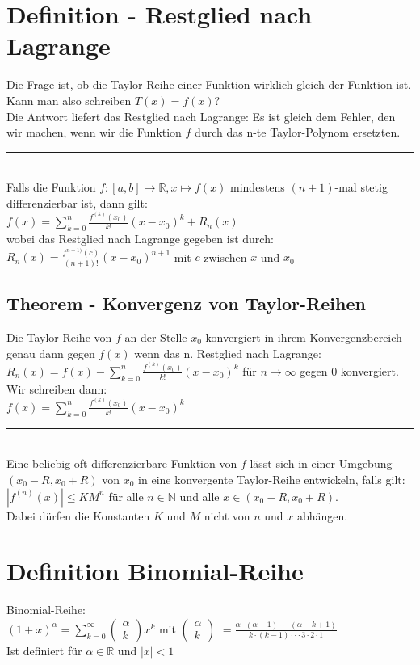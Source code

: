\documentclass[../main.tex]{subfiles}
\begin{document}
\section{Definition - Restglied nach Lagrange}
Die Frage ist, ob die Taylor-Reihe einer Funktion wirklich gleich der Funktion ist. 
Kann man also schreiben $T(x)=f(x)$? \\
Die Antwort liefert das Restglied nach Lagrange: Es ist gleich dem Fehler, den wir machen,
wenn wir die Funktion $f$ durch das n-te Taylor-Polynom ersetzten. \\
\noindent\rule{8cm}{0.4pt} \\
Falls die Funktion $f:[a,b]\to\mathbb{R},x\mapsto f(x)$ mindestens $(n+1)$-mal stetig
differenzierbar ist, dann gilt: \\ [7pt]
$f(x)=\sum\limits_{k=0}^n\frac{f^{(k)}(x_0)}{k!}(x-x_0)^k+R_n(x)$ \\ [7pt]
wobei das Restglied nach Lagrange gegeben ist durch: \\ [7pt]
$R_n(x)=\frac{f^{n+1)}(c)}{(n+1)!}(x-x_0)^{n+1}$ mit $c$ zwischen $x$ und $x_0$


\subsection{Theorem - Konvergenz von Taylor-Reihen}
Die Taylor-Reihe von $f$ an der Stelle $x_0$ konvergiert in ihrem Konvergenzbereich genau
dann gegen $f(x)$ wenn das n. Restglied nach Lagrange: \\ [7pt]
$R_n(x)=f(x)-\sum\limits_{k=0}^n\frac{f^{(k)}(x_0)}{k!}(x-x_0)^k$ für $n\to\infty$ gegen $0$ konvergiert.\\[7pt]
Wir schreiben dann: \\[7pt]
$f(x)=\sum\limits_{k=0}^n\frac{f^{(k)}(x_0)}{k!}(x-x_0)^k$
\noindent\rule{8cm}{0.4pt} \\
Eine beliebig oft differenzierbare Funktion von $f$ lässt sich in einer Umgebung $(x_0-R,x_0+R)$
von $x_0$ in eine konvergente Taylor-Reihe entwickeln, falls gilt: \\ [7pt]
$|f^{(n)}(x)|\leq KM^n$ für alle $n\in\mathbb{N}$ und alle $x\in(x_0-R,x_0+R)$. \\ [7pt]
Dabei dürfen die Konstanten $K$ und $M$ nicht von $n$ und $x$ abhängen.

\section{Definition Binomial-Reihe}
Binomial-Reihe: \\ [7pt]
$(1+x)^\alpha=\sum\limits_{k=0}^\infty\begin{pmatrix}\alpha \\k\end{pmatrix}x^k$
mit $\begin{pmatrix}\alpha \\k\end{pmatrix}$ 
$=\frac{\alpha\cdot(\alpha-1)\cdot\cdot\cdot(\alpha-k+1)}{k\cdot(k-1)\cdot\cdot\cdot 3\cdot 2\cdot 1}$ \\ [7pt]
Ist definiert für $\alpha \in \mathbb{R}$ und $|x|<1$
\end{document}
